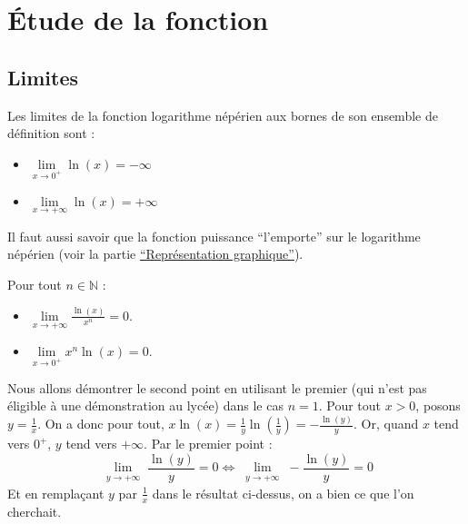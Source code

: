 	\section{Étude de la fonction}

	\subsection{Limites}

	\begin{formula}[Limites]
		Les limites de la fonction logarithme népérien aux bornes de son ensemble de définition sont :
		\begin{itemize}
			\item $\lim\limits_{x \rightarrow 0^+} \ln(x) = -\infty$
			\item $\lim\limits_{x \rightarrow +\infty} \ln(x) = +\infty$
		\end{itemize}
	\end{formula}

	Il faut aussi savoir que la fonction puissance ``l'emporte'' sur le logarithme népérien (voir la partie \hyperref[representation-graphique]{``Représentation graphique''}).

	\begin{formula}
		Pour tout $n \in \mathbb{N}$ :
		\begin{itemize}
			\item $\lim\limits_{x \rightarrow +\infty} \frac{\ln(x)}{x^n} = 0$.
			\item $\lim\limits_{x \rightarrow 0^+} x^n \ln(x) = 0$.
		\end{itemize}
	\end{formula}

	\begin{demonstration}
		Nous allons démontrer le second point en utilisant le premier (qui n'est pas éligible à une démonstration au lycée) dans le cas $n = 1$. Pour tout $x > 0$, posons $y = \frac{1}{x}$.
		\newpar
		On a donc pour tout, $x \ln(x) = \frac{1}{y} \ln\left(\frac{1}{y}\right) = -\frac{\ln(y)}{y}$.
		\newpar
		Or, quand $x$ tend vers $0^+$, $y$ tend vers $+\infty$. Par le premier point :
		\[ \lim\limits_{\substack{y \rightarrow +\infty}} \frac{\ln(y)}{y} = 0 \iff \lim\limits_{\substack{y \rightarrow +\infty}} -\frac{\ln(y)}{y} = 0 \]
		Et en remplaçant $y$ par $\frac{1}{x}$ dans le résultat ci-dessus, on a bien ce que l'on cherchait.
	\end{demonstration}


